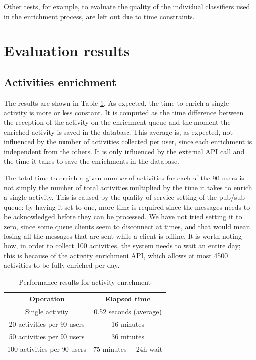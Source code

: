 Other tests, for example, to evaluate the quality of the individual classifiers used in the enrichment process, are left out due to time constraints.

\section{Evaluation results}

\subsection{Activities enrichment}
The results are shown in Table \ref{table:activity_time}. As expected, the time to enrich a single activity is more or less constant. It is computed as the time difference between the reception of the activity on the enrichment queue and the moment the enriched activity is saved in the database. This average is, as expected, not influenced by the number of activities collected per user, since each enrichment is independent from the others. It is only influenced by the external API call and the time it takes to save the enrichments in the database.

The total time to enrich a given number of activities for each of the 90 users is not simply the number of total activities multiplied by the time it takes to enrich a single activity. This is caused by the quality of service setting of the pub/sub queue: by having it set to one, more time is required since the messages needs to be acknowledged before they can be processed. We have not tried setting it to zero, since some queue clients seem to disconnect at times, and that would mean losing all the messages that are sent while a client is offline. It is worth noting how, in order to collect 100 activities, the system needs to wait an entire day; this is because of the activity enrichment API, which allows at most 4500 activities to be fully enriched per day.

\begin{table}[h]
\centering
\begin{tabular}{|c|c|}
    \hline
    \textbf{Operation} & \textbf{Elapsed time} \\
    \hline
    Single activity & 0.52 seconds (average) \\
    \hline
    20 activities per 90 users & 16 minutes \\
    \hline
    50 activities per 90 users & 36 minutes \\
    \hline
    100 activities per 90 users & 75 minutes + 24h wait \\
    \hline
\end{tabular}
\caption{Performance results for activity enrichment}
\label{table:activity_time}
\end{table}

